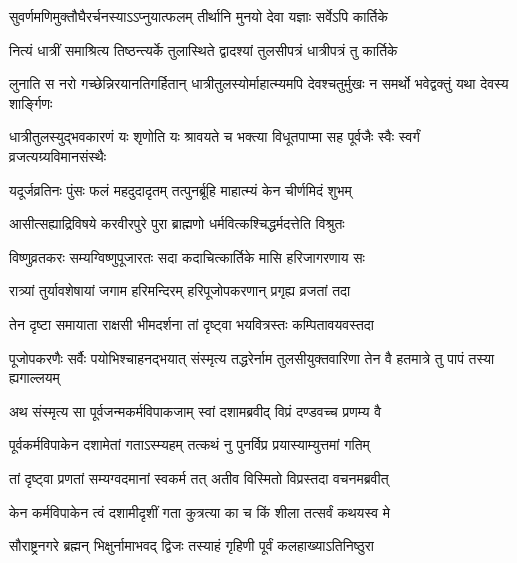 \twolineshloka
{सुवर्णमणिमुक्तौघैरर्चनस्याऽऽप्नुयात्फलम्}
{तीर्थानि मुनयो देवा यज्ञाः सर्वेऽपि कार्तिके} %

\twolineshloka
{नित्यं धात्रीं समाश्रित्य तिष्ठन्त्यर्के तुलास्थिते}
{द्वादश्यां तुलसीपत्रं धात्रीपत्रं तु कार्तिके} %

\threelineshloka
{लुनाति स नरो गच्छेन्निरयानतिगर्हितान्}
{धात्रीतुलस्योर्माहात्म्यमपि देवश्चतुर्मुखः}
{न समर्थो भवेद्वक्तुं यथा देवस्य शार्ङ्गिणः} %

\fourlineindentedshloka
{धात्रीतुलस्युद्भवकारणं यः}
{शृणोति यः श्रावयते च भक्त्या}
{विधूतपाप्मा सह पूर्वजैः स्वैः}
{स्वर्गं व्रजत्यग्र्यविमानसंस्थैः} %





\twolineshloka
{यदूर्जव्रतिनः पुंसः फलं महदुदादृतम्}
{तत्पुनर्ब्रूहि माहात्म्यं केन चीर्णमिदं शुभम्} %


\twolineshloka
{आसीत्सह्याद्रिविषये करवीरपुरे पुरा}
{ब्राह्मणो धर्मवित्कश्चिद्धर्मदत्तेति विश्रुतः} %

\twolineshloka
{विष्णुव्रतकरः सम्यग्विष्णुपूजारतः सदा}
{कदाचित्कार्तिके मासि हरिजागरणाय सः} %

\twolineshloka
{रात्र्यां तुर्यावशेषायां जगाम हरिमन्दिरम्}
{हरिपूजोपकरणान् प्रगृह्य व्रजतां तदा} %

\twolineshloka
{तेन दृष्टा समायाता राक्षसी भीमदर्शना}
{तां दृष्ट्वा भयवित्रस्तः कम्पितावयवस्तदा} %

\threelineshloka
{पूजोपकरणैः सर्वैः पयोभिश्चाहनद्भयात्}
{संस्मृत्य तद्धरेर्नाम तुलसीयुक्तवारिणा}
{तेन वै हतमात्रे तु पापं तस्या ह्यगाल्लयम्} %

\twolineshloka
{अथ संस्मृत्य सा पूर्वजन्मकर्मविपाकजाम्}
{स्वां दशामब्रवीद् विप्रं दण्डवच्च प्रणम्य वै} %


\twolineshloka
{पूर्वकर्मविपाकेन दशामेतां गताऽस्म्यहम्}
{तत्कथं नु पुनर्विप्र प्रयास्याम्युत्तमां गतिम्} %


\twolineshloka
{तां दृष्ट्वा प्रणतां सम्यग्वदमानां स्वकर्म तत्}
{अतीव विस्मितो विप्रस्तदा वचनमब्रवीत्} %

\twolineshloka
{केन कर्मविपाकेन त्वं दशामीदृशीं गता}
{कुत्रत्या का च किं शीला तत्सर्वं कथयस्व मे} %


\twolineshloka
{सौराष्ट्रनगरे ब्रह्मन् भिक्षुर्नामाभवद् द्विजः}
{तस्याहं गृहिणी पूर्वं कलहाख्याऽतिनिष्ठुरा} %

